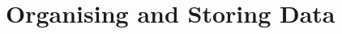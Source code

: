 \documentclass[\main/notes.tex]{subfiles}
\begin{document}
	\setcounter{chapter}{4}
	\chapter{Organising and Storing Data}
	\vbox{}
\end{document}
